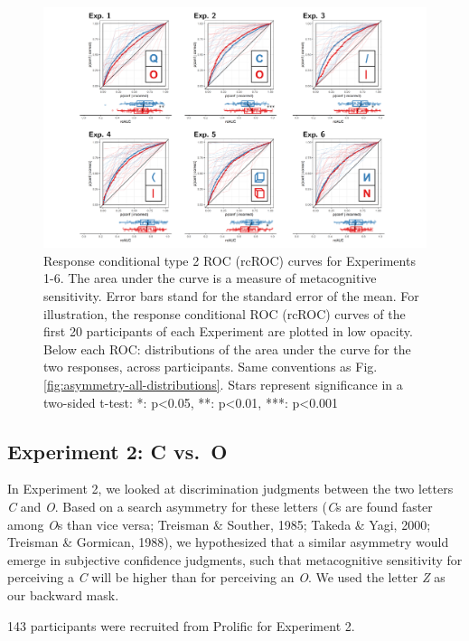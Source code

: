 \documentclass[12pt,twoside]{reedthesis}
\begin{document}
\begin{figure}
\includegraphics[width=1\linewidth]{figure/asymmetry/rcROCs} \caption[rcROC curves for Experiments 1-6]{Response conditional type 2 ROC (rcROC) curves for Experiments 1-6. The area under the curve is a measure of metacognitive sensitivity. Error bars stand for the standard error of the mean. For illustration, the response conditional ROC (rcROC) curves of the first 20 participants of each Experiment are plotted in low opacity. Below each ROC: distributions of the area under the curve for the two responses, across participants. Same conventions as Fig. \ref{fig:asymmetry-all-distributions}. Stars represent significance in a two-sided t-test: *: p\textless0.05, **: p\textless0.01, ***: p\textless0.001}\label{fig:asymmetry-all-rcROCs}
\end{figure}
\hypertarget{experiment-2-c-vs.-o}{%
\subsection{Experiment 2: C vs.~O}\label{experiment-2-c-vs.-o}}

In Experiment 2, we looked at discrimination judgments between the two letters \emph{C} and \emph{O}. Based on a search asymmetry for these letters (\emph{C}s are found faster among \emph{O}s than vice versa; Treisman \& Souther, 1985; Takeda \& Yagi, 2000; Treisman \& Gormican, 1988), we hypothesized that a similar asymmetry would emerge in subjective confidence judgments, such that metacognitive sensitivity for perceiving a \emph{C} will be higher than for perceiving an \emph{O}. We used the letter \emph{Z} as our backward mask.

143 participants were recruited from Prolific for Experiment 2.
\end{document}
